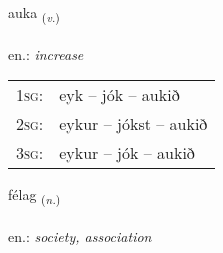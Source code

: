 \documentclass[frontgrid, backgrid]{flacards}\usepackage[]{graphicx}\usepackage[]{xcolor}
\begin{document}
\renewcommand{\blhead}{\vskip5pt {\small\bfseries\footnotesize Sagnorð | Verb }}
\renewcommand{\bcfoot}{\vskip5pt \hspace{2pt}{\small\bfseries\footnotesize 1K}}


{auka \small{\textsubscript{(\textit{v.})}} \\[1ex] %
\textphonetic{[œiːka]} \\
en.: \emph{increase} \\  [2ex]
\renewcommand*{\arraystretch}{0.8}
\begin{tabular}{p{1cm}l}
\textsc{1sg}: & eyk -- jók -- aukið \\ 
\textsc{2sg}: & eykur -- jókst -- aukið \\ 
\textsc{3sg}: & eykur -- jók -- aukið \\ 
\end{tabular}
}

\renewcommand{\flhead}{\vskip5pt \fboxsep=0pt {\small\bfseries\footnotesize Nafnorð | Noun}}
\renewcommand{\fcfoot}{\vskip5pt \fboxsep=0pt \hspace{2pt}{\small\bfseries\footnotesize 1K}}

\renewcommand{\blhead}{\vskip5pt {\small\bfseries\footnotesize Nafnorð | Noun }}
\renewcommand{\bcfoot}{\vskip5pt \hspace{2pt}{\small\bfseries\footnotesize 1K}}


{félag \small{\textsubscript{(\textit{n.})}} \\[1ex] %
\textphonetic{[fjɛːlaɣ]} \\
en.: \emph{society, association} \\  [2ex]
\renewcommand*{\arraystretch}{0.8}
}

\renewcommand{\flhead}{\vskip5pt \fboxsep=0pt {\small\bfseries\footnotesize Nafnorð | Noun}}
\renewcommand{\fcfoot}{\vskip5pt \fboxsep=0pt \hspace{2pt}{\small\bfseries\footnotesize 1K}}
\end{document}
